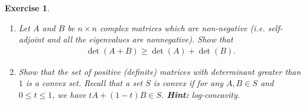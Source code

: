 \documentclass[11pt]{article}
\newtheorem{exercise}{Exercise}[section]
\theoremstyle{definition}
\numberwithin{equation}{subsection}
\begin{document}
\begin{exercise}{\rm *}
~\begin{enumerate}[label=(\alph*)]
    \item Let $A$ and $B$ be $n \times n$ complex matrices which are non-negative (i.e. self-adjoint and all the eigenvalues are nonnegative). Show that
    \begin{align*}
        \det (A + B) \geq \det (A) + \det (B).
    \end{align*}
    
    \item Show that the set of positive (definite) matrices with determinant greater than $1$ is a convex set. Recall that a set $S$ is convex if for any $A, B \in S$ and $0 \leq t \leq 1$, we have $tA + (1-t)B \in S$. {\bf Hint:} log-concavity.
\end{enumerate}
\end{exercise}
\end{document}

